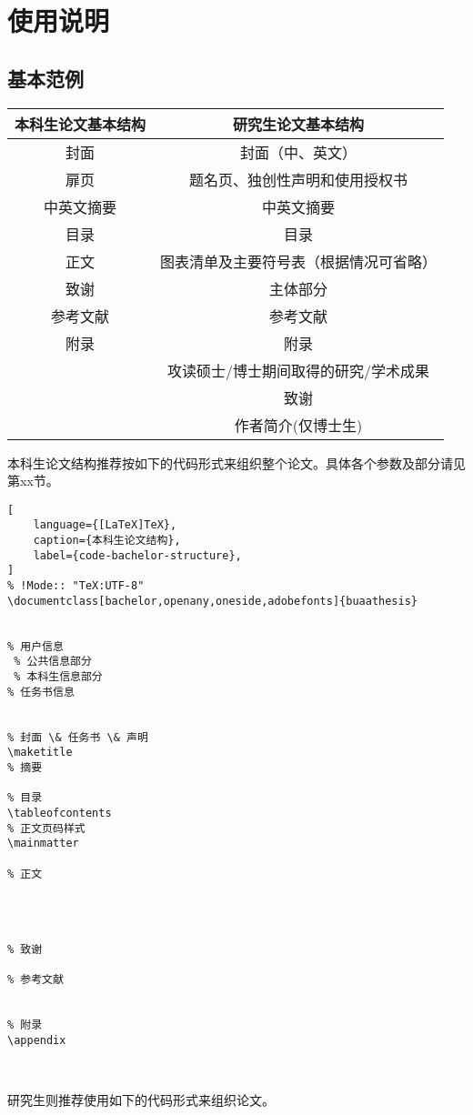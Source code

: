 \chapter{使用说明}
\section{基本范例}
\begin{table}
\begin{center}
    \begin{tabular}{c||c}
    \hline
    本科生论文基本结构 & 研究生论文基本结构\\\hline\hline
    封面 & 封面（中、英文）\\
    扉页 & 题名页、独创性声明和使用授权书\\
    中英文摘要 & 中英文摘要\\
    目录 & 目录\\
    正文 & 图表清单及主要符号表（根据情况可省略）\\
    致谢 & 主体部分\\
    参考文献 & 参考文献\\
    附录 & 附录\\
    ~~ & 攻读硕士/博士期间取得的研究\slash 学术成果\\
    ~~ & 致谢\\
    ~~ & 作者简介(仅博士生)\\
    \hline
    \end{tabular}
\end{center}
\end{table}
\qquad 本科生论文结构推荐按如下的代码形式来组织整个论文。具体各个参数及部分请见第xx节。

\begin{lstlisting}[
    language={[LaTeX]TeX},
    caption={本科生论文结构},
    label={code-bachelor-structure},
]
% !Mode:: "TeX:UTF-8"
\documentclass[bachelor,openany,oneside,adobefonts]{buaathesis}


% 用户信息
 % 公共信息部分
 % 本科生信息部分
% 任务书信息


% 封面 \& 任务书 \& 声明
\maketitle
% 摘要

% 目录
\tableofcontents
% 正文页码样式
\mainmatter

% 正文




% 致谢

% 参考文献


% 附录
\appendix



\end{lstlisting}
\qquad 研究生则推荐使用如下的代码形式来组织论文。

